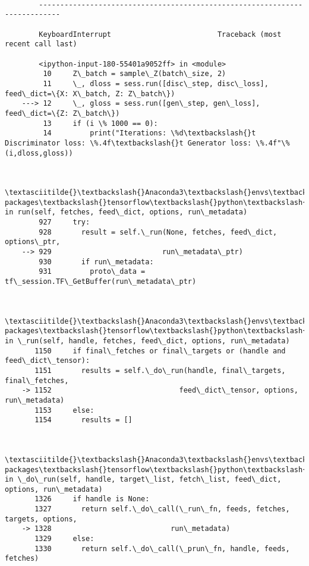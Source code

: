 \documentclass[11pt]{article}
\begin{document}
    \begin{Verbatim}[commandchars=\\\{\}]

        ---------------------------------------------------------------------------

        KeyboardInterrupt                         Traceback (most recent call last)

        <ipython-input-180-55401a9052ff> in <module>
         10     Z\_batch = sample\_Z(batch\_size, 2)
         11     \_, dloss = sess.run([disc\_step, disc\_loss], feed\_dict=\{X: X\_batch, Z: Z\_batch\})
    ---> 12     \_, gloss = sess.run([gen\_step, gen\_loss], feed\_dict=\{Z: Z\_batch\})
         13     if (i \% 1000 == 0):
         14         print("Iterations: \%d\textbackslash{}t Discriminator loss: \%.4f\textbackslash{}t Generator loss: \%.4f"\%(i,dloss,gloss))
    

        \textasciitilde{}\textbackslash{}Anaconda3\textbackslash{}envs\textbackslash{}keras2\textbackslash{}lib\textbackslash{}site-packages\textbackslash{}tensorflow\textbackslash{}python\textbackslash{}client\textbackslash{}session.py in run(self, fetches, feed\_dict, options, run\_metadata)
        927     try:
        928       result = self.\_run(None, fetches, feed\_dict, options\_ptr,
    --> 929                          run\_metadata\_ptr)
        930       if run\_metadata:
        931         proto\_data = tf\_session.TF\_GetBuffer(run\_metadata\_ptr)
    

        \textasciitilde{}\textbackslash{}Anaconda3\textbackslash{}envs\textbackslash{}keras2\textbackslash{}lib\textbackslash{}site-packages\textbackslash{}tensorflow\textbackslash{}python\textbackslash{}client\textbackslash{}session.py in \_run(self, handle, fetches, feed\_dict, options, run\_metadata)
       1150     if final\_fetches or final\_targets or (handle and feed\_dict\_tensor):
       1151       results = self.\_do\_run(handle, final\_targets, final\_fetches,
    -> 1152                              feed\_dict\_tensor, options, run\_metadata)
       1153     else:
       1154       results = []
    

        \textasciitilde{}\textbackslash{}Anaconda3\textbackslash{}envs\textbackslash{}keras2\textbackslash{}lib\textbackslash{}site-packages\textbackslash{}tensorflow\textbackslash{}python\textbackslash{}client\textbackslash{}session.py in \_do\_run(self, handle, target\_list, fetch\_list, feed\_dict, options, run\_metadata)
       1326     if handle is None:
       1327       return self.\_do\_call(\_run\_fn, feeds, fetches, targets, options,
    -> 1328                            run\_metadata)
       1329     else:
       1330       return self.\_do\_call(\_prun\_fn, handle, feeds, fetches)
    


\end{Verbatim}
\end{document}
